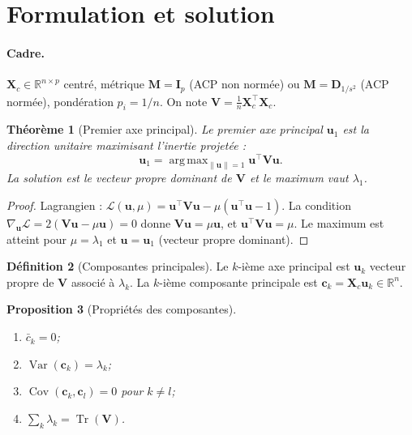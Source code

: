 \documentclass[11pt, a4paper, openany]{book}
\theoremstyle{plain}
\newtheorem{theorem}{Théorème}[chapter]
\newtheorem{proposition}[theorem]{Proposition}
\theoremstyle{definition}
\newtheorem{definition}[theorem]{Définition}
\theoremstyle{remark}
\newcommand{\R}{\mathbb{R}}
\newcommand{\1}{\mathds{1}}
\DeclareMathOperator{\Tr}{Tr}
\DeclareMathOperator{\Var}{Var}
\DeclareMathOperator{\Cov}{Cov}
\DeclareMathOperator*{\argmax}{arg\,max}
\newcommand{\X}{\mathbf{X}}
\newcommand{\V}{\mathbf{V}}
\newcommand{\M}{\mathbf{M}}
\begin{document}
\section{Formulation et solution}

\paragraph{Cadre.} $\X_c \in \R^{n \times p}$ centré, métrique
$\M = \mathbf{I}_p$ (ACP non normée) ou $\M = \mathbf{D}_{1/s^2}$ (ACP normée),
pondération $p_i = 1/n$. On note $\V = \frac{1}{n} \X_c^\top \X_c$.

\begin{theorem}[Premier axe principal]
Le premier axe principal $\mathbf{u}_1$ est la direction unitaire maximisant
l'inertie projetée :
\[
\mathbf{u}_1 = \argmax_{\|\mathbf{u}\|=1} \mathbf{u}^\top \V \mathbf{u}.
\]
La solution est le vecteur propre dominant de $\V$ et le maximum vaut $\lambda_1$.
\end{theorem}

\begin{proof}
Lagrangien : $\mathcal{L}(\mathbf{u}, \mu) = \mathbf{u}^\top \V \mathbf{u} - \mu(\mathbf{u}^\top \mathbf{u} - 1)$.
La condition $\nabla_{\mathbf{u}} \mathcal{L} = 2(\V \mathbf{u} - \mu \mathbf{u}) = 0$ donne
$\V \mathbf{u} = \mu \mathbf{u}$, et $\mathbf{u}^\top \V \mathbf{u} = \mu$. Le maximum est atteint pour
$\mu = \lambda_1$ et $\mathbf{u} = \mathbf{u}_1$ (vecteur propre dominant).
\end{proof}

\begin{definition}[Composantes principales]
Le $k$-ième axe principal est $\mathbf{u}_k$ vecteur propre de $\V$ associé à $\lambda_k$.
La $k$-ième composante principale est $\mathbf{c}_k = \X_c \mathbf{u}_k \in \R^n$.
\end{definition}

\begin{proposition}[Propriétés des composantes]
\begin{enumerate}
  \item $\bar{c}_k = 0$;
  \item $\Var(\mathbf{c}_k) = \lambda_k$;
  \item $\Cov(\mathbf{c}_k, \mathbf{c}_l) = 0$ pour $k \neq l$;
  \item $\sum_k \lambda_k = \Tr(\V)$.
\end{enumerate}
\end{proposition}
\end{document}

